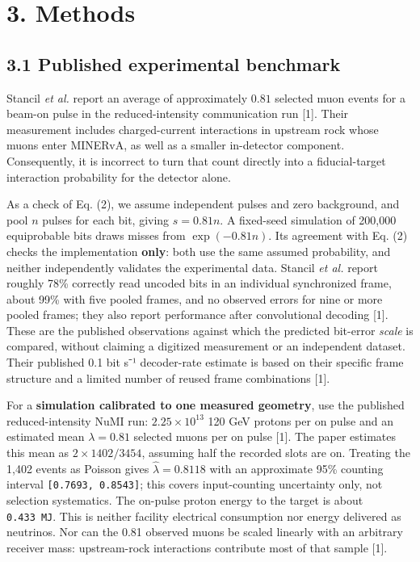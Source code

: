 \documentclass[
]{article}
\begin{document}
\hypertarget{methods}{%
\section{3. Methods}\label{methods}}

\hypertarget{published-experimental-benchmark}{%
\subsection{3.1 Published experimental
benchmark}\label{published-experimental-benchmark}}

Stancil \emph{et al.} report an average of approximately \(0.81\)
selected muon events for a beam-on pulse in the reduced-intensity
communication run {[}1{]}. Their measurement includes charged-current
interactions in upstream rock whose muons enter MINERvA, as well as a
smaller in-detector component. Consequently, it is incorrect to turn
that count directly into a fiducial-target interaction probability for
the detector alone.

As a check of Eq. (2), we assume independent pulses and zero background,
and pool \(n\) pulses for each bit, giving \(s = 0.81 n\). A fixed-seed
simulation of 200,000 equiprobable bits draws misses from
\(\exp(-0.81n)\). Its agreement with Eq. (2) checks the implementation
\textbf{only}: both use the same assumed probability, and neither
independently validates the experimental data. Stancil \emph{et al.}
report roughly 78\% correctly read uncoded bits in an individual
synchronized frame, about 99\% with five pooled frames, and no observed
errors for nine or more pooled frames; they also report performance
after convolutional decoding {[}1{]}. These are the published
observations against which the predicted bit-error \emph{scale} is
compared, without claiming a digitized measurement or an independent
dataset. Their published 0.1 bit s⁻¹ decoder-rate estimate is based on
their specific frame structure and a limited number of reused frame
combinations {[}1{]}.

For a \textbf{simulation calibrated to one measured geometry}, use the
published reduced-intensity NuMI run: \(2.25 \times 10^{13}\) 120 GeV
protons per on pulse and an estimated mean \({\lambda} = 0.81\) selected
muons per on pulse {[}1{]}. The paper estimates this mean as
\(2 \times 1402/3454\), assuming half the recorded slots are on.
Treating the 1,402 events as Poisson gives \({\hat{\lambda}} = 0.8118\)
with an approximate 95\% counting interval
\texttt{{[}0.7693,\ 0.8543{]}}; this covers input-counting uncertainty
only, not selection systematics. The on-pulse proton energy to the
target is about \texttt{0.433\ MJ}. This is neither facility electrical
consumption nor energy delivered as neutrinos. Nor can the 0.81 observed
muons be scaled linearly with an arbitrary receiver mass: upstream-rock
interactions contribute most of that sample {[}1{]}.
\end{document}
